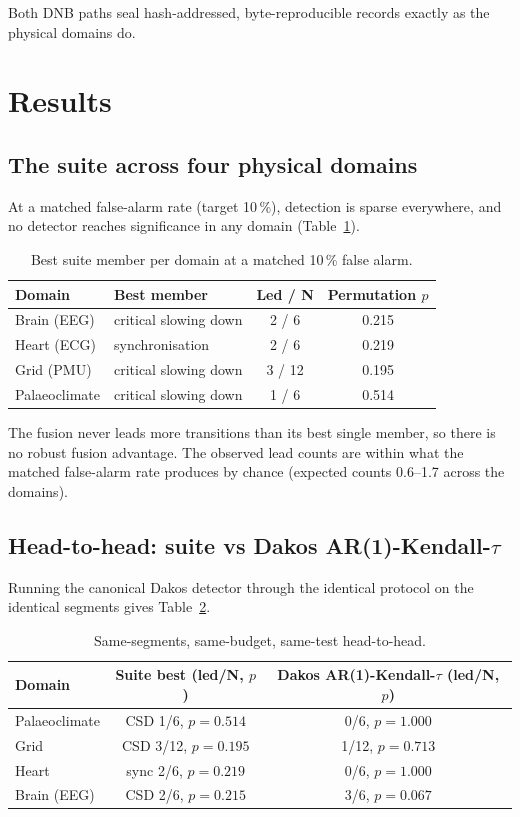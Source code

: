 \documentclass[aip,cha,preprint,amsmath,amssymb]{revtex4-2}
\begin{document}
Both DNB paths seal hash-addressed, byte-reproducible records exactly
as the physical domains do.

\section{Results}\label{sec:results}

\subsection{The suite across four physical domains}\label{sec:fourdomain}

At a matched false-alarm rate (target 10\,\%), detection is sparse
everywhere, and no detector reaches significance in any domain
(Table~\ref{tab:fourdomain}).

\begin{table}[h!]
\centering
\begin{tabular}{llcc}
\toprule
Domain & Best member & Led / N & Permutation $p$ \\
\midrule
Brain (EEG) & critical slowing down & 2 / 6 & 0.215 \\
Heart (ECG) & synchronisation & 2 / 6 & 0.219 \\
Grid (PMU) & critical slowing down & 3 / 12 & 0.195 \\
Palaeoclimate & critical slowing down & 1 / 6 & 0.514 \\
\bottomrule
\end{tabular}
\caption{Best suite member per domain at a matched 10\,\% false alarm.}
\label{tab:fourdomain}
\end{table}

The fusion never leads more transitions than its best single member, so
there is no robust fusion advantage. The observed lead counts are
within what the matched false-alarm rate produces by chance (expected
counts 0.6--1.7 across the domains).

\subsection{Head-to-head: suite vs Dakos AR(1)-Kendall-$\tau$}\label{sec:headtohead}

Running the canonical Dakos detector through the identical protocol on
the identical segments gives Table~\ref{tab:headtohead}.

\begin{table}[h!]
\centering
\begin{tabular}{lcc}
\toprule
Domain & Suite best (led/N, $p$) & Dakos AR(1)-Kendall-$\tau$ (led/N, $p$) \\
\midrule
Palaeoclimate & CSD 1/6, $p = 0.514$ & 0/6, $p = 1.000$ \\
Grid & CSD 3/12, $p = 0.195$ & 1/12, $p = 0.713$ \\
Heart & sync 2/6, $p = 0.219$ & 0/6, $p = 1.000$ \\
Brain (EEG) & CSD 2/6, $p = 0.215$ & 3/6, $p = 0.067$ \\
\bottomrule
\end{tabular}
\caption{Same-segments, same-budget, same-test head-to-head.}
\label{tab:headtohead}
\end{table}
\end{document}

